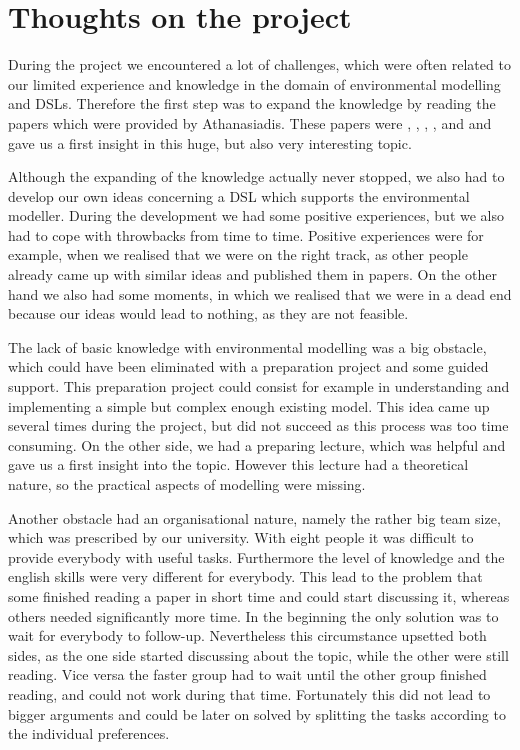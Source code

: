\section{Thoughts on the project}
\par
During the project we encountered a lot of challenges, which were often related to our limited experience and knowledge in the domain of environmental modelling and DSLs. Therefore the first step was to expand the knowledge by reading the papers which were provided by Athanasiadis. These papers were \autocite{dsl:muetzelfeldt}, \autocite{ontology:oom_mapping}, \autocite{Villa2009577}, \autocite{Lloyd:2011:EMF:1994475.1995042}, \autocite{dsl:mernik} and \autocite{dsl:kelly} and gave us a first insight in this huge, but also very interesting topic. %
\par
Although the expanding of the knowledge actually never stopped, we also had to develop our own ideas concerning a DSL which supports the environmental modeller. During the development we had some positive experiences, but we also had to cope with throwbacks from time to time. Positive experiences were for example, when we realised that we were on the right track, as other people already came up with similar ideas and published them in papers. On the other hand we also had some moments, in which we realised that we were in a dead end because our ideas would lead to nothing, as they are not feasible.
\par
The lack of basic knowledge with environmental modelling was a big obstacle, which could have been eliminated with a preparation project and some guided support. This preparation project could consist for example in understanding and implementing a simple but complex enough existing model. This idea came up several times during the project, but did not succeed as this process was too time consuming. On the other side, we had a preparing lecture, which was helpful and gave us a first insight into the topic. However this lecture had a theoretical nature, so the practical aspects of modelling were missing.
\par
Another obstacle had an organisational nature, namely the rather big team size, which was prescribed by our university. With eight people it was difficult to provide everybody with useful tasks. Furthermore the level of knowledge and the english skills were very different for everybody. This lead to the problem that some finished reading a paper in short time and could start discussing it, whereas others needed significantly more time. In the beginning the only solution was to wait for everybody to follow-up. Nevertheless this circumstance upsetted both sides, as the one side started discussing about the topic, while the other were still reading. Vice versa the faster group had to wait until the other group finished reading, and could not work during that time. Fortunately this did not lead to bigger arguments and could be later on solved by splitting the tasks according to the individual preferences.
